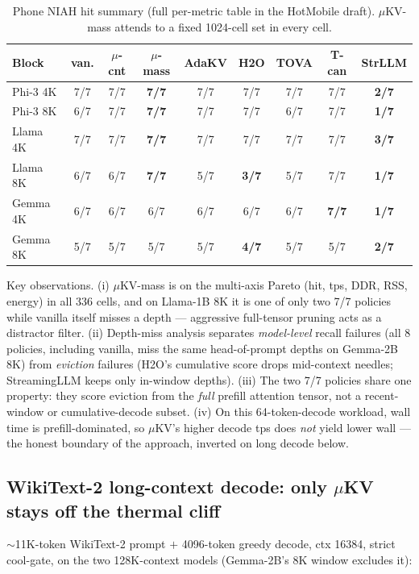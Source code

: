 \documentclass[sigconf, anonymous=false, screen=true]{acmart}
\newcommand{\good}[1]{\textcolor{endurkvgreen}{\textbf{#1}}}
\newcommand{\bad}[1]{\textcolor{endurkvred}{\textbf{#1}}}
\begin{document}
\begin{table}[h]
\caption{Phone NIAH hit summary (full per-metric table in the HotMobile draft). $\mu$KV-mass attends to a fixed 1024-cell set in every cell.}
\label{tab:campaign-niah}
\centering\small
\setlength{\tabcolsep}{3.5pt}
\begin{tabular}{l c c c c c c c c}
\toprule
\textbf{Block} & \textbf{van.} & \textbf{$\mu$-cnt} & \textbf{$\mu$-mass} & \textbf{AdaKV} & \textbf{H2O} & \textbf{TOVA} & \textbf{T-can} & \textbf{StrLLM} \\
\midrule
Phi-3 4K   & 7/7 & 7/7 & \good{7/7} & 7/7 & 7/7 & 7/7 & 7/7 & \bad{2/7} \\
Phi-3 8K   & 6/7 & 7/7 & \good{7/7} & 7/7 & 7/7 & 6/7 & 7/7 & \bad{1/7} \\
Llama 4K   & 7/7 & 7/7 & \good{7/7} & 7/7 & 7/7 & 7/7 & 7/7 & \bad{3/7} \\
Llama 8K   & 6/7 & 6/7 & \good{7/7} & 5/7 & \bad{3/7} & 5/7 & 7/7 & \bad{1/7} \\
Gemma 4K   & 6/7 & 6/7 & 6/7 & 6/7 & 6/7 & 6/7 & \good{7/7} & \bad{1/7} \\
Gemma 8K   & 5/7 & 5/7 & 5/7 & 5/7 & \bad{4/7} & 5/7 & 5/7 & \bad{2/7} \\
\bottomrule
\end{tabular}
\end{table}

Key observations. (i) $\mu$KV-mass is on the multi-axis Pareto (hit, tps, DDR, RSS, energy) in all 336 cells, and on Llama-1B 8K it is one of only two 7/7 policies while vanilla itself misses a depth --- aggressive full-tensor pruning acts as a distractor filter. (ii) Depth-miss analysis separates \emph{model-level} recall failures (all 8 policies, including vanilla, miss the same head-of-prompt depths on Gemma-2B 8K) from \emph{eviction} failures (H2O's cumulative score drops mid-context needles; StreamingLLM keeps only in-window depths). (iii) The two 7/7 policies share one property: they score eviction from the \emph{full} prefill attention tensor, not a recent-window or cumulative-decode subset. (iv) On this 64-token-decode workload, wall time is prefill-dominated, so $\mu$KV's higher decode tps does \emph{not} yield lower wall --- the honest boundary of the approach, inverted on long decode below.

\subsection{WikiText-2 long-context decode: only $\mu$KV stays off the thermal cliff}
$\sim$11K-token WikiText-2 prompt $+$ 4096-token greedy decode, ctx 16384, strict cool-gate, on the two 128K-context models (Gemma-2B's 8K window excludes it):
\end{document}
